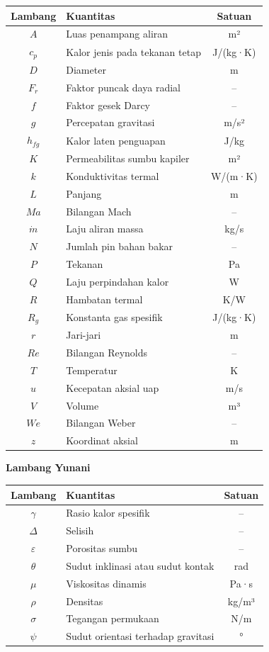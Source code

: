 \documentclass[
  indonesian,
  12pt,
  a4paper,
]{report}
\newcounter{none} %
\begin{document}
{\def\LTcaptype{none} %
\begin{longtable}[]{@{}clc@{}}
\toprule\noalign{}
Lambang & Kuantitas & Satuan \\
\midrule\noalign{}
\endhead
\bottomrule\noalign{}
\endlastfoot
\(A\) & Luas penampang aliran & m² \\
\(c_p\) & Kalor jenis pada tekanan tetap & J/(kg·K) \\
\(D\) & Diameter & m \\
\(F_r\) & Faktor puncak daya radial & -- \\
\(f\) & Faktor gesek Darcy & -- \\
\(g\) & Percepatan gravitasi & m/s² \\
\(h_{fg}\) & Kalor laten penguapan & J/kg \\
\(K\) & Permeabilitas sumbu kapiler & m² \\
\(k\) & Konduktivitas termal & W/(m·K) \\
\(L\) & Panjang & m \\
\(Ma\) & Bilangan Mach & -- \\
\(\dot m\) & Laju aliran massa & kg/s \\
\(N\) & Jumlah pin bahan bakar & -- \\
\(P\) & Tekanan & Pa \\
\(Q\) & Laju perpindahan kalor & W \\
\(R\) & Hambatan termal & K/W \\
\(R_g\) & Konstanta gas spesifik & J/(kg·K) \\
\(r\) & Jari-jari & m \\
\(Re\) & Bilangan Reynolds & -- \\
\(T\) & Temperatur & K \\
\(u\) & Kecepatan aksial uap & m/s \\
\(V\) & Volume & m³ \\
\(We\) & Bilangan Weber & -- \\
\(z\) & Koordinat aksial & m \\
\end{longtable}
}

\textbf{Lambang Yunani}

{\def\LTcaptype{none} %
\begin{longtable}[]{@{}clc@{}}
\toprule\noalign{}
Lambang & Kuantitas & Satuan \\
\midrule\noalign{}
\endhead
\bottomrule\noalign{}
\endlastfoot
\(\gamma\) & Rasio kalor spesifik & -- \\
\(\Delta\) & Selisih & -- \\
\(\varepsilon\) & Porositas sumbu & -- \\
\(\theta\) & Sudut inklinasi atau sudut kontak & rad \\
\(\mu\) & Viskositas dinamis & Pa·s \\
\(\rho\) & Densitas & kg/m³ \\
\(\sigma\) & Tegangan permukaan & N/m \\
\(\psi\) & Sudut orientasi terhadap gravitasi & ° \\
\end{longtable}
}
\end{document}
